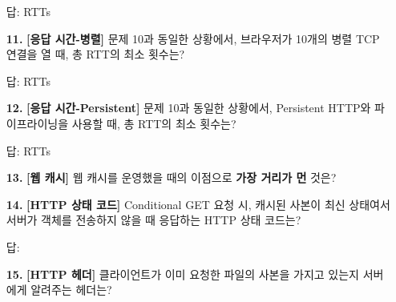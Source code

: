 \documentclass[a4paper, 10pt]{article}
\newcommand{\ansline}[1]{\underline{\hspace{#1}}}
\begin{document}
\begin{enumerate}[itemsep=3em, leftmargin=2em, label={}]
답: \ansline{3cm} RTTs



\item[\textbf{11.}] \textbf{[응답 시간-병렬]} 문제 10과 동일한 상황에서, 브라우저가 10개의 병렬 TCP 연결을 열 때, 총 RTT의 최소 횟수는?



답: \ansline{3cm} RTTs



\item[\textbf{12.}] \textbf{[응답 시간-Persistent]} 문제 10과 동일한 상황에서, Persistent HTTP와 파이프라이닝을 사용할 때, 총 RTT의 최소 횟수는?



답: \ansline{3cm} RTTs



\item[\textbf{13.}] \textbf{[웹 캐시]} 웹 캐시를 운영했을 때의 이점으로 \textbf{가장 거리가 먼} 것은?






\item[\textbf{14.}] \textbf{[HTTP 상태 코드]} Conditional GET 요청 시, 캐시된 사본이 최신 상태여서 서버가 객체를 전송하지 않을 때 응답하는 HTTP 상태 코드는?



답: \ansline{4cm}



\item[\textbf{15.}] \textbf{[HTTP 헤더]} 클라이언트가 이미 요청한 파일의 사본을 가지고 있는지 서버에게 알려주는 헤더는?



\begin{mchoice}


\end{mchoice}
\end{enumerate}
\end{document}
